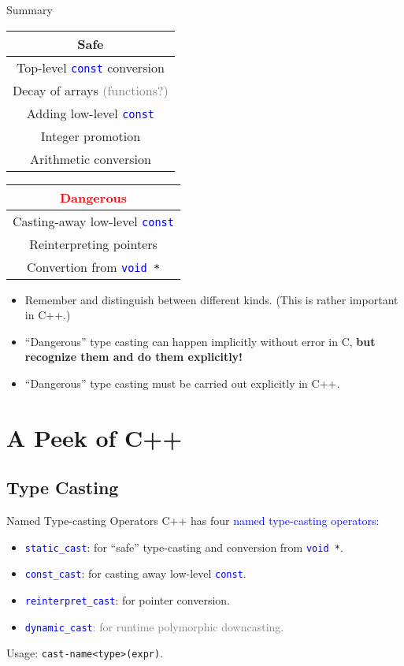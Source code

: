 \documentclass[handout]{beamer}
\newcommand{\red}[1]{\textcolor{red}{#1}}
\newcommand{\blue}[1]{\textcolor{blue}{#1}}
\newcommand{\gray}[1]{\textcolor{gray}{#1}}
\newcommand{\ttt}[1]{\texttt{#1}}
\newcommand{\bluett}[1]{\blue{\ttt{#1}}}
\theoremstyle{definition}
\begin{document}
\begin{frame}{Summary}
    \begin{center}
        \begin{tabular}{|c|}
            \hline
            Safe\\
            \hline
            Top-level \bluett{const} conversion\\
            Decay of arrays \gray{(functions?)}\\
            Adding low-level \bluett{const}\\
            Integer promotion\\
            Arithmetic conversion\\
            \hline
        \end{tabular}
        \begin{tabular}{|c|}
            \hline
            \red{Dangerous}\\
            \hline
            Casting-away low-level \bluett{const}\\
            Reinterpreting pointers\\
            Convertion from \bluett{void }\ttt{*}\\
            \hline
        \end{tabular}
    \end{center}
    \begin{itemize}
        \item Remember and distinguish between different kinds. (This is rather important in C++.)
        \item ``Dangerous'' type casting can happen implicitly without error in C, \textbf{but recognize them and do them explicitly!}
        \item ``Dangerous'' type casting must be carried out explicitly in C++.
    \end{itemize}
\end{frame}

\section{A Peek of C++}

\subsection{Type Casting}

\begin{frame}{Named Type-casting Operators}
    C++ has four \blue{named type-casting operators}:
    \begin{itemize}
        \item \bluett{static\_cast}: for ``safe'' type-casting and conversion from \bluett{void }\ttt{*}.
        \item \bluett{const\_cast}: for casting away low-level \bluett{const}.
        \item \bluett{reinterpret\_cast}: for pointer conversion.
        \item \gray{\bluett{dynamic\_cast}: for runtime polymorphic downcasting.}
    \end{itemize}
    \pause
    Usage: \ttt{cast-name<type>(expr)}.
\end{frame}
\end{document}
